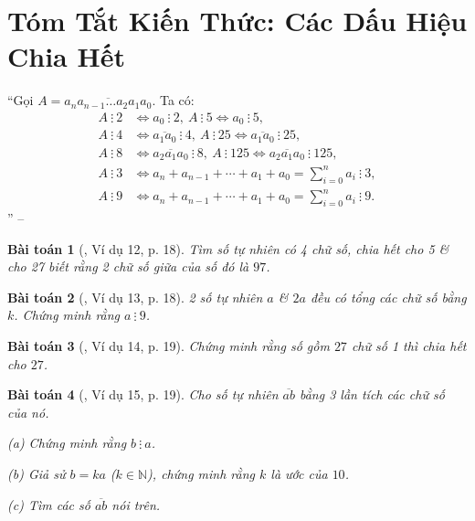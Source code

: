 \documentclass[oneside]{book}
\numberwithin{equation}{section}
\newtheorem{baitoan}{Bài toán}[section]
\begin{document}
\section*{Tóm Tắt Kiến Thức: Các Dấu Hiệu Chia Hết}
``Gọi $A = \overline{a_na_{n-1}\ldots a_2a_1a_0}$. Ta có:
\begin{align*}
	A\ \vdots\ 2&\Leftrightarrow a_0\ \vdots\ 2,\ A\ \vdots\ 5\Leftrightarrow a_0\ \vdots\ 5,\\
	A\ \vdots\ 4&\Leftrightarrow\overline{a_1a_0}\ \vdots\ 4,\ A\ \vdots\ 25\Leftrightarrow\overline{a_1a_0}\ \vdots\ 25,\\
	A\ \vdots\ 8&\Leftrightarrow\overline{a_2a_1a_0}\ \vdots\ 8,\ A\ \vdots\ 125\Leftrightarrow\overline{a_2a_1a_0}\ \vdots\ 125,\\
	A\ \vdots\ 3&\Leftrightarrow a_n + a_{n-1} + \cdots + a_1 + a_0 = \sum_{i=0}^n a_i\ \vdots\ 3,\\
	A\ \vdots\ 9&\Leftrightarrow a_n + a_{n-1} + \cdots + a_1 + a_0 = \sum_{i=0}^n a_i\ \vdots\ 9.
\end{align*}
'' -- \cite[\S4, p. 18]{Binh_Toan_6_tap_1}

\begin{baitoan}[\cite{Binh_Toan_6_tap_1}, Ví dụ 12, p. 18]
	Tìm số tự nhiên có 4 chữ số, chia hết cho 5 \& cho 27 biết rằng 2 chữ số giữa của số đó là $97$.
\end{baitoan}

\begin{baitoan}[\cite{Binh_Toan_6_tap_1}, Ví dụ 13, p. 18]
	2 số tự nhiên $a$ \& $2a$ đều có tổng các chữ số bằng $k$. Chứng minh rằng $a\ \vdots\ 9$.
\end{baitoan}

\begin{baitoan}[\cite{Binh_Toan_6_tap_1}, Ví dụ 14, p. 19]
	Chứng minh rằng số gồm $27$ chữ số 1 thì chia hết cho $27$.
\end{baitoan}

\begin{baitoan}[\cite{Binh_Toan_6_tap_1}, Ví dụ 15, p. 19]
	Cho số tự nhiên $\overline{ab}$ bằng 3 lần tích các chữ số của nó.
	\begin{enumerate*}
		\item[(a)] Chứng minh rằng $b\ \vdots\ a$.
		\item[(b)] Giả sử $b = ka$ ($k\in\mathbb{N}$), chứng minh rằng $k$ là ước của $10$.
		\item[(c)] Tìm các số $\overline{ab}$ nói trên.
	\end{enumerate*}
\end{baitoan}
\end{document}
